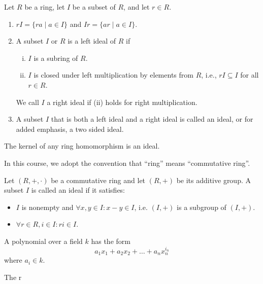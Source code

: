 \begin{defn}[Ideal]
  Let $R$ be a ring, let $I$ be a subset of $R$, and let $r \in R$.
  \begin{enumerate}
    \item $rI = \{ra \mid a \in I \}$ and $Ir = \{ar \mid a \in I \}$.
    \item A subset $I$ or $R$ is a left ideal of $R$ if
      \begin{enumerate}[(i)]
        \item $I$ is a subring of $R$.
        \item $I$ is closed under left multiplication by elements from $R$,
        i.e., $rI \subseteq I$ for all $r \in R$.
      \end{enumerate}
    We call $I$ a right ideal if (ii) holds for right multiplication.  
    \item A subset $I$ that is both a left ideal and a right ideal is called an
    ideal, or for added emphasis, a two sided ideal.
  \end{enumerate}
\end{defn}


\begin{remark}
  The kernel of any ring homomorphism is an ideal.
\end{remark}


\begin{remark}
  In this course, we adopt the convention that ``ring'' means ``commutative
  ring''.
\end{remark}


\begin{defn}
  Let $(R,+,\cdot)$ be a commutative ring and let $(R, +)$ be its additive
  group. A subset $I$ is called an ideal if it satisfies:
  \begin{itemize}
    \item $I$ is nonempty and $\forall x,y \in I : x-y \in I$, i.e. $(I,+)$ is a
    subgroup of $(I,+)$.
    \item $\forall r \in R, i \in I : ri \in I$.
  \end{itemize}
\end{defn}


\begin{defn}
  A polynomial over a field $k$ has the form
  \[ a_1 x_1 + a_2 x_2 + \ldots + a_n x_n^{i_n}\]
  where $a_i \in k$.
\end{defn}

\begin{defn}
  The r
\end{defn}